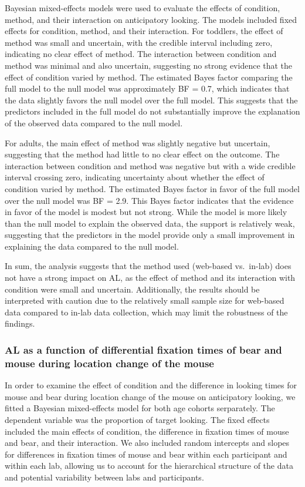 \documentclass[
  man, donotrepeattitle,floatsintext]{apa6}
\begin{document}
Bayesian mixed-effects models were used to evaluate the effects of condition, method, and their interaction on anticipatory looking. The models included fixed effects for condition, method, and their interaction. For toddlers, the effect of method was small and uncertain, with the credible interval including zero, indicating no clear effect of method. The interaction between condition and method was minimal and also uncertain, suggesting no strong evidence that the effect of condition varied by method. The estimated Bayes factor comparing the full model to the null model was approximately BF = 0.7, which indicates that the data slightly favors the null model over the full model. This suggests that the predictors included in the full model do not substantially improve the explanation of the observed data compared to the null model.

For adults, the main effect of method was slightly negative but uncertain, suggesting that the method had little to no clear effect on the outcome. The interaction between condition and method was negative but with a wide credible interval crossing zero, indicating uncertainty about whether the effect of condition varied by method. The estimated Bayes factor in favor of the full model over the null model was BF = 2.9. This Bayes factor indicates that the evidence in favor of the model is modest but not strong. While the model is more likely than the null model to explain the observed data, the support is relatively weak, suggesting that the predictors in the model provide only a small improvement in explaining the data compared to the null model.

In sum, the analysis suggests that the method used (web-based vs.~in-lab) does not have a strong impact on AL, as the effect of method and its interaction with condition were small and uncertain. Additionally, the results should be interpreted with caution due to the relatively small sample size for web-based data compared to in-lab data collection, which may limit the robustness of the findings.

\subsubsection{AL as a function of differential fixation times of bear and mouse during location change of the mouse}\label{al-as-a-function-of-differential-fixation-times-of-bear-and-mouse-during-location-change-of-the-mouse}

In order to examine the effect of condition and the difference in looking times for mouse and bear during location change of the mouse on anticipatory looking, we fitted a Bayesian mixed-effects model for both age cohorts serparately. The dependent variable was the proportion of target looking. The fixed effects included the main effects of condition, the difference in fixation times of mouse and bear, and their interaction. We also included random intercepts and slopes for differences in fixation times of mouse and bear within each participant and within each lab, allowing us to account for the hierarchical structure of the data and potential variability between labs and participants.
\end{document}
